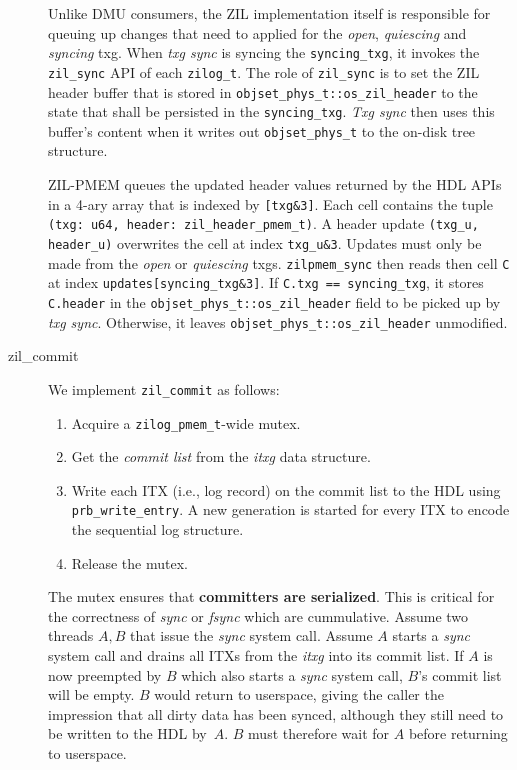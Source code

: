 \documentclass[12pt,a4paper,twoside]{book}
\begin{document}
\begin{description}
        Unlike DMU consumers, the ZIL implementation itself is responsible for queuing up changes that need to applied for the \textit{open}, \textit{quiescing} and \textit{syncing} txg.
        When \textit{txg sync} is syncing the \lstinline{syncing_txg}, it invokes the \lstinline{zil_sync} API of each \lstinline{zilog_t}.
        The role of \lstinline{zil_sync} is to set the ZIL header buffer that is stored in \lstinline{objset_phys_t::os_zil_header} to the state that shall be persisted in the \lstinline{syncing_txg}.
        \textit{Txg sync} then uses this buffer's content when it writes out \lstinline{objset_phys_t} to the on-disk tree structure.

        ZIL-PMEM queues the updated header values returned by the HDL APIs in a 4-ary array that is indexed by \lstinline{[txg&3]}.
        Each cell contains the tuple \lstinline{(txg: u64, header: zil_header_pmem_t)}.
        A header update \lstinline{(txg_u, header_u)} overwrites the cell at index \lstinline{txg_u&3}.
        Updates must only be made from the \textit{open} or \textit{quiescing} txgs.
        \lstinline{zilpmem_sync} then reads then cell \lstinline{C} at index \lstinline{updates[syncing_txg&3]}.
        If \lstinline{C.txg == syncing_txg}, it stores \lstinline{C.header} in the \lstinline{objset_phys_t::os_zil_header} field to be picked up by \textit{txg sync}.
        Otherwise, it leaves \lstinline{objset_phys_t::os_zil_header} unmodified.

    \item[zil\_commit]
        We implement \lstinline{zil_commit} as follows:
        \begin{enumerate}[noitemsep]
            \item Acquire a \lstinline{zilog_pmem_t}-wide mutex.
            \item Get the \textit{commit list} from the \textit{itxg} data structure.
            \item Write each ITX (i.e., log record) on the commit list to the HDL using \lstinline{prb_write_entry}.
                A new generation is started for every ITX to encode the sequential log structure.
            \item Release the mutex.
        \end{enumerate}
        The mutex ensures that \textbf{committers are serialized}.
        This is critical for the correctness of \textit{sync} or \textit{fsync} which are cummulative.
        Assume two threads $A, B$ that issue the \textit{sync} system call.
        Assume $A$ starts a \textit{sync} system call and drains all ITXs from the \textit{itxg} into its commit list.
        If $A$ is now preempted by $B$ which also starts a \textit{sync} system call, $B$'s commit list will be empty.
        $B$ would return to userspace, giving the caller the impression that all dirty data has been synced, although they still need to be written to the HDL by~$A$.
        $B$ must therefore wait for $A$ before returning to userspace.


\end{description}
\end{document}
